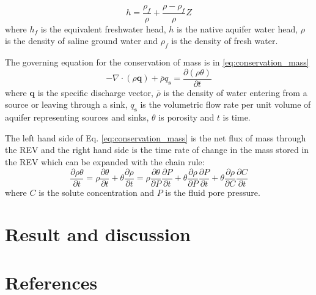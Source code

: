 \documentclass[review]{elsarticle}
\newcommand{\mbf}[1]{{\mathbf{#1}}}%
\begin{document}
\begin{equation}\label{eq:hf_h}
h = \frac{\rho_f}{\rho} + \frac{\rho - \rho_f}{\rho}Z 
\end{equation}
where $h_f$ is the equivalent freshwater head, $h$ is the native aquifer water head, $\rho$ is the density of saline ground water and $\rho_f$ is the density of fresh water.

The governing equation for the conservation of mass is in \ref{eq:conservation_mass}
\begin{equation}\label{eq:conservation_mass}
-\nabla\cdot(\rho \mbf{q}) + \bar{\rho} q_\mbf{s} = \frac{\partial(\rho\theta)}{\partial t} 
\end{equation}
where $\mbf{q}$ is the specific discharge vector, $\bar{\rho}$ is the density of water entering from a source or leaving through a sink, $q_\mbf{s}$ is the volumetric flow rate per unit volume of aquifer representing sources and sinks, $\theta$ is porosity and $t$ is time. \par

The left hand side of Eq. \ref{eq:conservation_mass} is the net flux of mass through the REV and the right hand side is the time rate of change in the mass stored in the REV which can be expanded with the chain rule: 
\begin{equation}\label{eq:rho_theta_t}
\frac{\partial \rho \theta}{\partial t} = \rho \frac{\partial \theta}{\partial t} + \theta\frac{\partial \rho}{\partial t} = \rho \frac{\partial \theta}{\partial P}\frac{\partial P}{\partial t} + \theta\frac{\partial \rho}{\partial P}\frac{\partial P}{\partial t} + \theta\frac{\partial \rho}{\partial C}\frac{\partial C}{\partial t}  
\end{equation}
where $C$ is the solute concentration and $P$ is the fluid pore pressure. 
 

\section{Result and discussion}


\section*{References}


\end{document}
